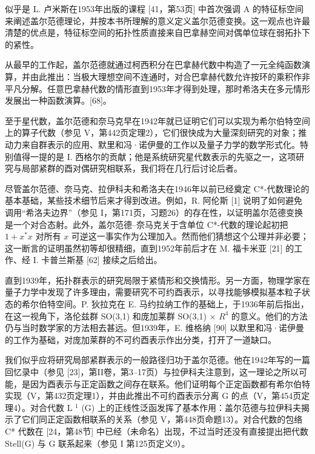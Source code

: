 似乎是 L. 卢米斯在1953年出版的课程 {[}41，第53页{]} 中首次强调 A 的特征标空间来阐述盖尔范德理论，并按本书所理解的意义定义盖尔范德变换。这一观点也许最清楚的优点是，特征标空间的拓扑性质直接来自巴拿赫空间对偶单位球在弱拓扑下的紧性。

从最早的工作起，盖尔范德就通过柯西积分在巴拿赫代数中构造了一元全纯函数演算，并由此推出：当极大理想空间不连通时，对合巴拿赫代数允许按环的乘积作非平凡分解。任意巴拿赫代数的情形直到1953年才得到处理，那时希洛夫在多元情形发展出一种函数演算。{[}68{]}。

至于星代数，盖尔范德和奈马克早在1942年就已证明它们可以实现为希尔伯特空间上的算子代数（参见 V，第442页定理2），它们很快成为大量深刻研究的对象；推动力来自群表示的应用、默里和冯·诺伊曼的工作以及量子力学的数学形式化。特别值得一提的是 I. 西格尔的贡献；他是系统研究星代数表示的先驱之一，这项研究与局部紧群的酉对偶研究相联系，我们将在几行后讨论后者。

尽管盖尔范德、奈马克、拉伊科夫和希洛夫在1946年以前已经奠定 C*-代数理论的基本基础，某些技术细节后来才得到改进。例如，R. 阿伦斯 {[}1{]} 说明了如何避免调用“希洛夫边界”（参见 I，第171页，习题26）的存在性，以证明盖尔范德变换是一个对合态射。此外，盖尔范德--奈马克关于含单位 C*-代数的理论起初把 \(1 + x^{*}x\) 对所有 \(x\) 可逆这一事实作为公理加入。然而他们猜想这个公理并非必要；这一断言的证明虽然初等却很精细，直到1952年前后才在 M. 福卡米亚 {[}21{]} 的工作、经 I. 卡普兰斯基 {[}62{]} 接续之后给出。


直到1939年，拓扑群表示的研究局限于紧情形和交换情形。另一方面，物理学家在量子力学中发现了许多理由，需要研究不可约酉表示，以寻找能够模拟基本粒子状态的希尔伯特空间。P. 狄拉克在 E. 马约拉纳工作的基础上，于1936年前后指出，在这一视角下，洛伦兹群 SO(3,1) 和庞加莱群 SO(3,1) × \(R^{4}\) 的意义。他们的方法仍与当时数学家的方法相去甚远。但1939年，E. 维格纳 {[}90{]} 以默里和冯·诺伊曼的工作为基础，对庞加莱群的不可约酉表示作出分类，打开了一道缺口。

我们似乎应将研究局部紧群表示的一般路径归功于盖尔范德。他在1942年写的一篇回忆录中（参见 {[}23{]}，第II卷，第3--17页）与拉伊科夫注意到，这一理论之所以可能，是因为酉表示与正定函数之间存在联系。他们证明每个正定函数都有希尔伯特实现（V，第432页定理1），并由此推出不可约酉表示分离 G 的点（V，第454页定理4）。对合代数 L \(^{1}\) (G) 上的正线性泛函发挥了基本作用：盖尔范德与拉伊科夫揭示了它们同正定函数相联系的关系（参见 V，第448页命题13）。对合代数的包络 C* 代数在 {[}24，第48节{]} 中已经（未命名）出现，不过当时还没有直接提出把代数 Stell(G) 与 G 联系起来（参见 I 第125页定义9）。

